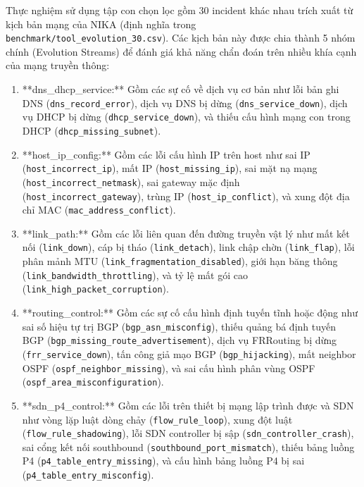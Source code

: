 Thực nghiệm sử dụng tập con chọn lọc gồm 30 incident khác nhau trích xuất từ kịch bản mạng của NIKA (định nghĩa trong \texttt{benchmark/tool\_evolution\_30.csv}). Các kịch bản này được chia thành 5 nhóm chính (Evolution Streams) để đánh giá khả năng chẩn đoán trên nhiều khía cạnh của mạng truyền thông:
\begin{enumerate}
    \item **dns\_dhcp\_service:** Gồm các sự cố về dịch vụ cơ bản như lỗi bản ghi DNS (\texttt{dns\_record\_error}), dịch vụ DNS bị dừng (\texttt{dns\_service\_down}), dịch vụ DHCP bị dừng (\texttt{dhcp\_service\_down}), và thiếu cấu hình mạng con trong DHCP (\texttt{dhcp\_missing\_subnet}).
    \item **host\_ip\_config:** Gồm các lỗi cấu hình IP trên host như sai IP (\texttt{host\_incorrect\_ip}), mất IP (\texttt{host\_missing\_ip}), sai mặt nạ mạng (\texttt{host\_incorrect\_netmask}), sai gateway mặc định (\texttt{host\_incorrect\_gateway}), trùng IP (\texttt{host\_ip\_conflict}), và xung đột địa chỉ MAC (\texttt{mac\_address\_conflict}).
    \item **link\_path:** Gồm các lỗi liên quan đến đường truyền vật lý như mất kết nối (\texttt{link\_down}), cáp bị tháo (\texttt{link\_detach}), link chập chờn (\texttt{link\_flap}), lỗi phân mảnh MTU (\texttt{link\_fragmentation\_disabled}), giới hạn băng thông (\texttt{link\_bandwidth\_throttling}), và tỷ lệ mất gói cao (\texttt{link\_high\_packet\_corruption}).
    \item **routing\_control:** Gồm các sự cố cấu hình định tuyến tĩnh hoặc động như sai số hiệu tự trị BGP (\texttt{bgp\_asn\_misconfig}), thiếu quảng bá định tuyến BGP (\texttt{bgp\_missing\_route\_advertisement}), dịch vụ FRRouting bị dừng (\texttt{frr\_service\_down}), tấn công giả mạo BGP (\texttt{bgp\_hijacking}), mất neighbor OSPF (\texttt{ospf\_neighbor\_missing}), và sai cấu hình phân vùng OSPF (\texttt{ospf\_area\_misconfiguration}).
    \item **sdn\_p4\_control:** Gồm các lỗi trên thiết bị mạng lập trình được và SDN như vòng lặp luật dòng chảy (\texttt{flow\_rule\_loop}), xung đột luật (\texttt{flow\_rule\_shadowing}), lỗi SDN controller bị sập (\texttt{sdn\_controller\_crash}), sai cổng kết nối southbound (\texttt{southbound\_port\_mismatch}), thiếu bảng luồng P4 (\texttt{p4\_table\_entry\_missing}), và cấu hình bảng luồng P4 bị sai (\texttt{p4\_table\_entry\_misconfig}).
\end{enumerate}


